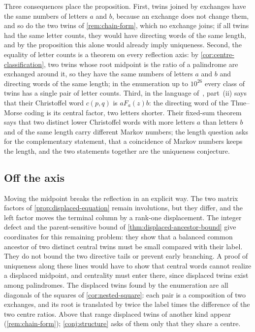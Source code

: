 Three consequences place the proposition. First, twins joined by exchanges have the same numbers
of letters $a$ and $b$, because an exchange does not change them, and so do the two twins of
\cref{rem:chain-form}, which no exchange joins; if all twins had the same letter counts, they would
have directing words of the same length, and by the proposition this alone would already imply
uniqueness. Second, the equality of letter counts is a theorem on every
reflection axis: by \cref{cor:centre-classification}, two twins whose root midpoint is the ratio of
a palindrome are exchanged around it, so they have the same numbers of letters $a$ and $b$ and
directing words of the same length; in the enumeration up to $10^{26}$ every class of twins has a
single pair of letter counts. Third, in the language
of~\cite{LagisquetEtAl2021}, part~(ii) says that their Christoffel word $c(p,q)$ is $aF_a(z)b$: the
directing word of the Thue--Morse coding is its central factor, two letters shorter. Their fixed-sum
theorem says that two distinct lower Christoffel words with more letters $a$ than letters $b$ and
of the same length carry different Markov numbers; the length question asks for
the complementary statement, that a coincidence of Markov numbers keeps the length, and the two
statements together are the uniqueness conjecture.

\subsection{Off the axis}

Moving the midpoint breaks the reflection in an explicit way. The two matrix factors of
\cref{prop:displaced-equation} remain involutions, but they differ, and the left factor moves
the terminal column by a rank-one displacement. The integer defect and the parent-sensitive
bound of \cref{thm:displaced-ancestor-bound} give coordinates for this remaining problem: they
show that a balanced common ancestor of two distinct central twins must be small compared with
their label. They do not bound the two directive tails or prevent early branching. A proof of
uniqueness along these lines would have to show that central words cannot realize a displaced
midpoint, and centrality must enter there, since displaced twins exist among palindromes. The
displaced twins found by the enumeration are all diagonals of the squares of
\cref{cor:nested-square}: each pair is a composition of two exchanges, and its root is translated by
twice the label times the difference of the two centre ratios. Above that range displaced twins of
another kind appear (\cref{rem:chain-form}); \cref{conj:structure} asks of them only that they share
a centre.
